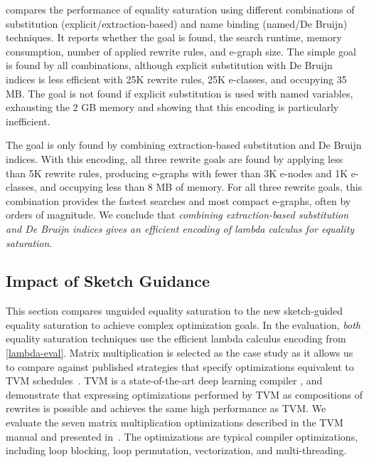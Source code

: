  compares the performance of equality saturation using different combinations of substitution (explicit/extraction-based) and name binding (named/De Bruijn) techniques.
It reports whether the goal is found, the search runtime, memory consumption, number of applied rewrite rules, and e-graph size.
The simple \reductionGoal{} goal is found by all combinations, although explicit substitution with De Bruijn indices is less efficient with 25K rewrite rules, 25K e-classes, and occupying 35 MB.
The \fission{} goal is not found if explicit substitution is used with named variables, exhausting the 2 GB memory and showing that this encoding is particularly inefficient.

The \binomial{} goal is only found by combining extraction-based substitution and De Bruijn indices.
With this encoding, all three rewrite goals are found by applying less than 5K rewrite rules, producing e-graphs with fewer than 3K e-nodes and 1K e-classes, and occupying less than 8 MB of memory.
For all three rewrite goals, this combination provides the fastest searches and most compact e-graphs, often by orders of magnitude.
We conclude that \emph{combining extraction-based substitution and De Bruijn indices gives an efficient encoding of lambda calculus for equality saturation}.


\subsection{Impact of Sketch Guidance}
\label{mm-eval}

This section compares unguided equality saturation to the new sketch-guided equality saturation to achieve complex optimization goals.
In the evaluation, \emph{both} equality saturation techniques use the efficient lambda calculus encoding from \cref{lambda-eval}.
Matrix multiplication is selected as the case study as it allows us to compare against published \Elevate{} strategies that specify optimizations equivalent to TVM schedules~\cite{hagedorn2020-elevate}.
TVM is a state-of-the-art deep learning compiler \cite{chen2018-tvm}, and \citet{hagedorn2020-elevate} demonstrate that expressing optimizations performed by TVM as compositions of rewrites is possible and achieves the same high performance as TVM.
We evaluate the seven matrix multiplication optimizations described in the TVM manual and presented in~\cite{hagedorn2020-elevate}.
The optimizations are typical compiler optimizations, including loop blocking, loop permutation, vectorization, and multi-threading.

